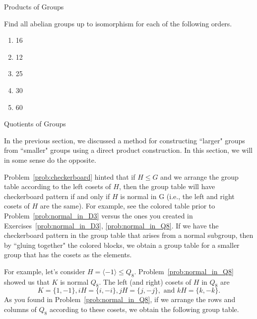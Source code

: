 \begin{section}{Products of Groups}
\begin{problem}
Find all abelian groups up to isomorphism for each of the following orders.
\begin{enumerate}[label=\textrm{(\alph*)}]
\item 16
\item 12
\item 25
\item 30
\item 60
\end{enumerate}
\end{problem}

\end{section}

\begin{section}{Quotients of Groups}

In the previous section, we discussed a method for constructing ``larger" groups from ``smaller" groups using a direct product construction.  In this section, we will in some sense do the opposite.

Problem~\ref{prob:checkerboard} hinted that if $H\leq G$ and we arrange the group table according to the left cosets of $H$, then the group table will have checkerboard pattern if and only if $H$ is normal in G (i.e., the left and right cosets of $H$ are the same).  For example, see the colored table prior to Problem~\ref{prob:normal_in_D3} versus the ones you created in Exercises~\ref{prob:normal_in_D3}, \ref{prob:normal_in_Q8}.  If we have the checkerboard pattern in the group table that arises from a normal subgroup, then by ``gluing together" the colored blocks, we obtain a group table for a smaller group that has the cosets as the elements. 

For example, let's consider $H=\langle -1\rangle \leq Q_8$.  Problem~\ref{prob:normal_in_Q8} showed us that $K$ is normal $Q_8$.  The left (and right) cosets of $H$ in $Q_8$ are
\[
K=\{1,-1\}, iH=\{i,-i\}, jH=\{j,-j\}, \text{ and } kH=\{k,-k\}.
\]
As you found in Problem~\ref{prob:normal_in_Q8}, if we arrange the rows and columns of $Q_8$ according to these cosets, we obtain the following group table.


\end{section}

